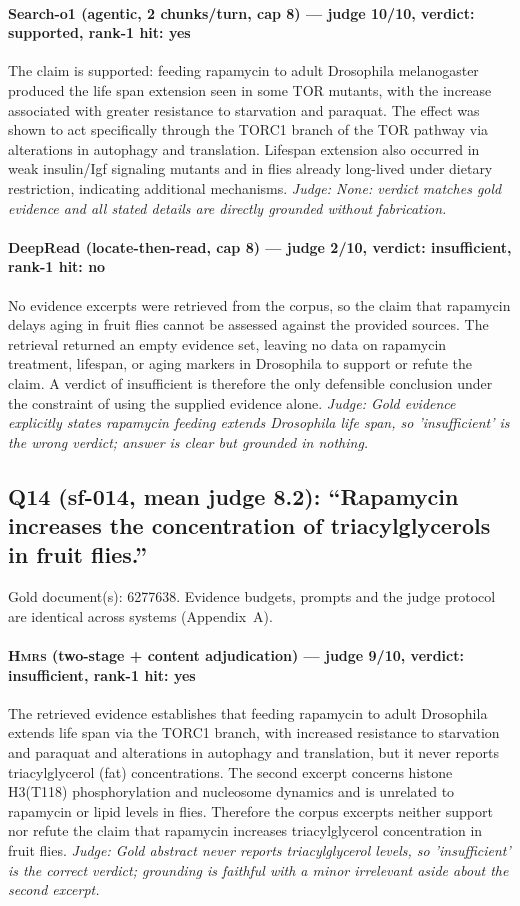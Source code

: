 \documentclass[sigconf, review, anonymous]{acmart}
\begin{document}
\paragraph{Search-o1 (agentic, 2 chunks/turn, cap 8) --- judge 10/10, verdict: supported, rank-1 hit: yes}
\noindent The claim is supported: feeding rapamycin to adult Drosophila melanogaster produced the life span extension seen in some TOR mutants, with the increase associated with greater resistance to starvation and paraquat. The effect was shown to act specifically through the TORC1 branch of the TOR pathway via alterations in autophagy and translation. Lifespan extension also occurred in weak insulin/Igf signaling mutants and in flies already long-lived under dietary restriction, indicating additional mechanisms.
\noindent\small\textit{Judge: None: verdict matches gold evidence and all stated details are directly grounded without fabrication.}
\paragraph{DeepRead (locate-then-read, cap 8) --- judge 2/10, verdict: insufficient, rank-1 hit: no}
\noindent No evidence excerpts were retrieved from the corpus, so the claim that rapamycin delays aging in fruit flies cannot be assessed against the provided sources. The retrieval returned an empty evidence set, leaving no data on rapamycin treatment, lifespan, or aging markers in Drosophila to support or refute the claim. A verdict of insufficient is therefore the only defensible conclusion under the constraint of using the supplied evidence alone.
\noindent\small\textit{Judge: Gold evidence explicitly states rapamycin feeding extends Drosophila life span, so 'insufficient' is the wrong verdict; answer is clear but grounded in nothing.}

\subsection{Q14 (sf-014, mean judge 8.2): ``Rapamycin increases the concentration of triacylglycerols in fruit flies.''}
\label{app:q14}
\noindent Gold document(s): 6277638. Evidence budgets, prompts and the judge protocol are identical across systems (Appendix~A).
\paragraph{\textbf{\textsc{Hmrs}} (two-stage + content adjudication) --- judge 9/10, verdict: insufficient, rank-1 hit: yes}
\noindent The retrieved evidence establishes that feeding rapamycin to adult Drosophila extends life span via the TORC1 branch, with increased resistance to starvation and paraquat and alterations in autophagy and translation, but it never reports triacylglycerol (fat) concentrations. The second excerpt concerns histone H3(T118) phosphorylation and nucleosome dynamics and is unrelated to rapamycin or lipid levels in flies. Therefore the corpus excerpts neither support nor refute the claim that rapamycin increases triacylglycerol concentration in fruit flies.
\noindent\small\textit{Judge: Gold abstract never reports triacylglycerol levels, so 'insufficient' is the correct verdict; grounding is faithful with a minor irrelevant aside about the second excerpt.}
\end{document}
